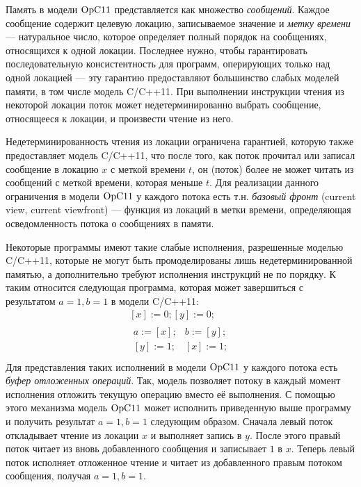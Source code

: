 Память в модели $\mathrm{OpC11}$ представляется как множество \emph{сообщений}. Каждое сообщение содержит целевую локацию, записываемое значение и
\emph{метку времени} --- натуральное число, которое определяет полный порядок на сообщениях, относящихся к одной локации.
Последнее нужно, чтобы гарантировать последовательную консистентность для программ, оперирующих только над одной локацией --- эту гарантию
предоставляют большинство слабых моделей памяти, в том числе модель C/C++11.
При выполнении инструкции чтения из некоторой локации поток может недетерминированно выбрать сообщение, относящееся к локации, и произвести
чтение из него.


Недетерминированность чтения из локации ограничена гарантией, которую также предоставляет модель C/C++11, что
после того, как поток прочитал или записал сообщение в локацию $x$ с меткой времени $t$, он (поток) более не может читать из сообщений
с меткой времени, которая меньше $t$. Для реализации данного ограничения в модели $\mathrm{OpC11}$ у каждого потока есть т.н. \emph{базовый фронт}
(current view, current viewfront) --- функция из локаций в метки времени, определяющая осведомленность потока о сообщениях в памяти.

Некоторые программы имеют такие слабые исполнения, разрешенные моделью C/C++11, которые не могут быть промоделированы лишь недетерминированной
памятью, а дополнительно требуют исполнения инструкций не по порядку. К таким относится следующая программа, которая может завершиться с
результатом $a = 1, b = 1$ в модели C/C++11:
\[
\begin{array}{c}
[x] := 0; [y] := 0; \\
\begin{array}{l||l}
  {} a := [x]; & b := [y]; \\
  {} [y] := 1; & [x] := 1; \\
\end{array}
\end{array}
\]
Для представления таких исполнений в модели $\mathrm{OpC11}$ у каждого потока есть \emph{буфер отложенных операций}. Так, модель
позволяет потоку в каждый момент исполнения отложить текущую операцию вместо её выполнения.
С помощью этого механизма модель $\mathrm{OpC11}$ может исполнить приведенную выше программу и получить результат $a = 1, b = 1$ следующим образом.
Сначала левый поток откладывает чтение из локации $x$ и выполняет запись в $y$. После этого правый поток читает из вновь добавленного
сообщения и записывает $1$ в $x$. Теперь левый поток исполняет отложенное чтение и читает из добавленного правым потоком сообщения, получая
$a = 1, b = 1$.

